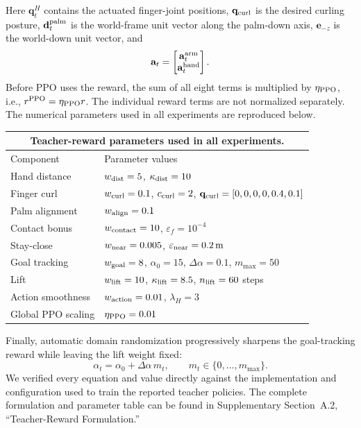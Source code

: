 \documentclass[11pt]{article}
\begin{document}
Here $\mathbf q_t^H$ contains the actuated finger-joint positions,
$\mathbf q_{\rm curl}$ is the desired curling posture,
$\mathbf d_t^{\rm palm}$ is the world-frame unit vector along the palm-down
axis, $\mathbf e_{-z}$ is the world-down unit vector, and
\begin{equation*}
\mathbf a_t=
\begin{bmatrix}\mathbf a_t^{\rm arm}\\ \mathbf a_t^{\rm hand}\end{bmatrix}.
\end{equation*}
Before PPO uses the reward, the sum of all eight terms is multiplied by
$\eta_{\rm PPO}$, i.e., $r^{\rm PPO}=\eta_{\rm PPO}r$. The individual reward
terms are not normalized separately. The numerical parameters used in all
experiments are reproduced below.

\begin{center}
\small
\renewcommand{\arraystretch}{1.05}
\begin{tabularx}{\linewidth}{@{}lX@{}}
\multicolumn{2}{c}{\textbf{Teacher-reward parameters used in all experiments.}}\\[2pt]
\toprule
Component & Parameter values \\
\midrule
Hand distance & $w_{\rm dist}=5$, $\kappa_{\rm dist}=10$ \\
Finger curl & $w_{\rm curl}=0.1$, $c_{\rm curl}=2$,
$\mathbf q_{\rm curl}=[0,0,0,0,0.4,0.1]$ \\
Palm alignment & $w_{\rm align}=0.1$ \\
Contact bonus & $w_{\rm contact}=10$, $\varepsilon_f=10^{-4}$ \\
Stay-close & $w_{\rm near}=0.005$, $\varepsilon_{\rm near}=0.2\,\mathrm{m}$ \\
Goal tracking & $w_{\rm goal}=8$, $\alpha_0=15$,
$\Delta\alpha=0.1$, $m_{\max}=50$ \\
Lift & $w_{\rm lift}=10$, $\kappa_{\rm lift}=8.5$,
$n_{\rm lift}=60$ steps \\
Action smoothness & $w_{\rm action}=0.01$, $\lambda_H=3$ \\
Global PPO scaling & $\eta_{\rm PPO}=0.01$ \\
\bottomrule
\end{tabularx}
\end{center}
Finally, automatic domain randomization progressively sharpens the
goal-tracking reward while leaving the lift weight fixed:
\begin{equation*}
\alpha_t=\alpha_0+\Delta\alpha\,m_t,
\qquad m_t\in\{0,\ldots,m_{\max}\}.
\end{equation*}
We verified every equation and value directly against the implementation and
configuration used to train the reported teacher policies. The complete
formulation and parameter table can be found in Supplementary Section~A.2,
``Teacher-Reward Formulation.''
\end{document}
